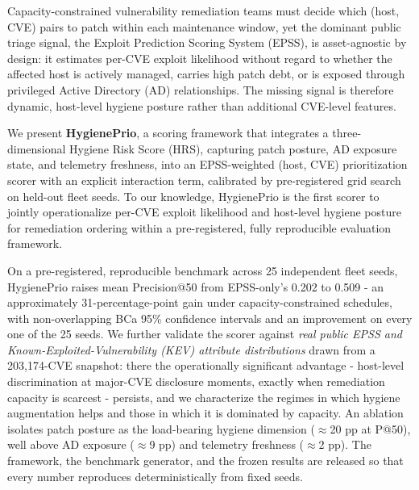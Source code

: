 Capacity-constrained vulnerability remediation teams must decide which (host, CVE) pairs to patch within each maintenance window, yet the dominant public triage signal, the Exploit Prediction Scoring System (EPSS), is asset-agnostic by design: it estimates per-CVE exploit likelihood without regard to whether the affected host is actively managed, carries high patch debt, or is exposed through privileged Active Directory (AD) relationships. The missing signal is therefore dynamic, host-level hygiene posture rather than additional CVE-level features.

We present \textbf{HygienePrio}, a scoring framework that integrates a three-dimensional Hygiene Risk Score (HRS), capturing patch posture, AD exposure state, and telemetry freshness, into an EPSS-weighted (host, CVE) prioritization scorer with an explicit interaction term, calibrated by pre-registered grid search on held-out fleet seeds. To our knowledge, HygienePrio is the first scorer to jointly operationalize per-CVE exploit likelihood and host-level hygiene posture for remediation ordering within a pre-registered, fully reproducible evaluation framework.

On a pre-registered, reproducible benchmark across 25 independent fleet seeds, HygienePrio raises mean Precision@50 from EPSS-only's 0.202 to 0.509 - an approximately 31-percentage-point gain under capacity-constrained schedules, with non-overlapping BCa 95\% confidence intervals and an improvement on every one of the 25 seeds. We further validate the scorer against \emph{real public EPSS and Known-Exploited-Vulnerability (KEV) attribute distributions} drawn from a 203{,}174-CVE snapshot: there the operationally significant advantage - host-level discrimination at major-CVE disclosure moments, exactly when remediation capacity is scarcest - persists, and we characterize the regimes in which hygiene augmentation helps and those in which it is dominated by capacity. An ablation isolates patch posture as the load-bearing hygiene dimension ($\approx$20 pp at P@50), well above AD exposure ($\approx$9 pp) and telemetry freshness ($\approx$2 pp). The framework, the benchmark generator, and the frozen results are released so that every number reproduces deterministically from fixed seeds.
